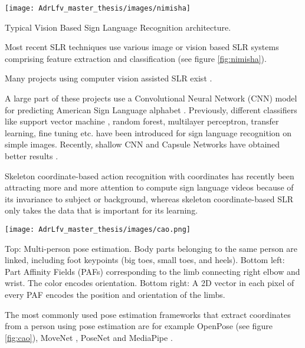\begin{marginfigure}
    \centering
    \texttt{[image: AdrLfv\_master\_thesis/images/nimisha]}
    \caption{Typical Vision Based Sign Language Recognition architecture.}
    \label{fig:nimisha}
\end{marginfigure}

Most recent SLR techniques use various image or vision based SLR systems comprising feature extraction and classification \cite{nimisha2020brief} (see figure \ref{fig:nimisha}). 

Many projects using computer vision assisted SLR exist \cite{admasu2010ethiopian} \cite{deriche2019intelligent} \cite{ahram2021advances} \cite{song2021intelligent} \cite{lee2021american} \cite{lee2021comparative} \cite{gao2021rnn}. 

A large part of these projects use a Convolutional Neural Network (CNN) model for predicting American Sign Language alphabet \cite{bin2019study}. Previously, different classifiers like support vector machine \cite{savur2015real}, random forest, multilayer perceptron, transfer learning, fine tuning \cite{saleh2020arabic} etc. have been introduced for sign language recognition on simple images. Recently, shallow CNN and Capsule Networks have obtained better results \cite{hasan2020classification}. 

Skeleton coordinate-based action recognition with coordinates has recently been attracting more and more attention to compute sign language videos because of its invariance to subject or background, whereas skeleton coordinate-based SLR only takes the data that is important for its learning. 

\begin{marginfigure}
    \centering
    \texttt{[image: AdrLfv\_master\_thesis/images/cao.png]}
    \caption{Top: Multi-person pose estimation. Body parts belonging to the same person are linked, including foot keypoints (big toes, small toes, and heels). Bottom left: Part Affinity Fields (PAFs) corresponding to the limb connecting right elbow and wrist. The color encodes orientation. Bottom right: A 2D vector in each pixel of every PAF encodes the position and orientation of the limbs.}
    \label{fig:cao}
\end{marginfigure}

The most commonly used pose estimation frameworks that extract coordinates from a person using pose estimation are for example OpenPose \cite{cao2017realtime} (see figure \ref{fig:cao}), MoveNet \cite{movenet}, PoseNet \cite{kendall2015posenet} and MediaPipe \cite{lugaresi2019mediapipe}.




